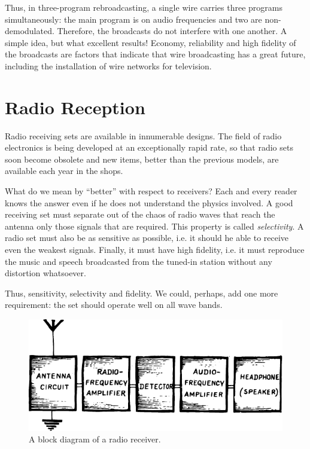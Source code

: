 Thus, in three-program rebroadcasting, a single wire carries three programs simultaneously: the main program is on audio frequencies and two are non-demodulated. Therefore, the broadcasts do not interfere with one another. A simple idea, but what excellent results! Economy, reliability and high fidelity of the broadcasts are factors that indicate that wire broadcasting has a great future, including the installation of wire networks for television.

\section{Radio Reception}
Radio receiving sets are available in innumerable designs. The field of radio electronics is being developed at an exceptionally rapid rate, so that radio sets soon become obsolete and new items, better than the previous models, are available each year in the shops.

What do we mean by ``better'' with respect to receivers? Each and every reader knows the answer even if he does not understand the physics involved. A good receiving set must separate out of the chaos of radio waves that reach the antenna only those signals that are required. This property is called \emph{selectivity}. A radio set must also be as sensitive as possible, i.e. it should he able to receive even the weakest signals. Finally, it must have high fidelity, i.e. it must reproduce the music and speech broadcasted from the tuned-in station without any distortion whatsoever.

Thus, sensitivity, selectivity and fidelity. We could, perhaps, add one more requirement: the set should operate well on all wave bands.

\begin{figure}[!ht]
\centering
\includegraphics[width=\textwidth]{figures/fig-06-10.pdf}
\caption{A block diagram of a radio receiver.}
\label{fig-6.10}
\end{figure}

